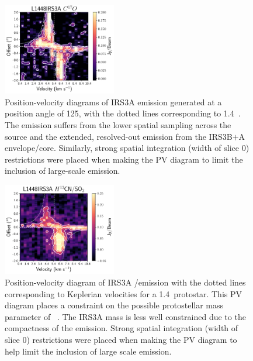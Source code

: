 \begin{figure}[H]
\begin{center}
\includegraphics[width=0.44\textwidth]{img/PV-Diagram_L1448IRS3B_C17O_clean_binnedwide.pdf}
\end{center}
\caption{Position-velocity diagrams of IRS3A \cso\space emission generated at a position angle of 125\deg, with the dotted lines corresponding to 1.4~\solm. The emission suffers from the lower spatial sampling across the source and the extended, resolved-out emission from the IRS3B$+$A envelope/core. Similarly, strong spatial integration (width of slice 0) restrictions were placed when making the PV diagram to limit the inclusion of large-scale emission. }\label{fig:l1448irs3a_cso_pv}
\end{figure}








\begin{figure}[H]
\begin{center}
\includegraphics[width=0.44\textwidth]{img/irs3a_h13cn_pv.pdf}
\end{center}
\caption{Position-velocity diagram of IRS3A \htcn/\sot\space emission with the dotted lines corresponding to Keplerian velocities for a 1.4~\solm\space protostar. This PV diagram places a constraint on the possible protostellar mass parameter of ~\solm. The IRS3A mass is less well constrained due to the compactness of the emission. Strong spatial integration (width of slice 0) restrictions were placed when making the PV diagram to help limit the inclusion of large scale emission.}\label{fig:l1448irs3a_h13cn_pv}
\end{figure}


